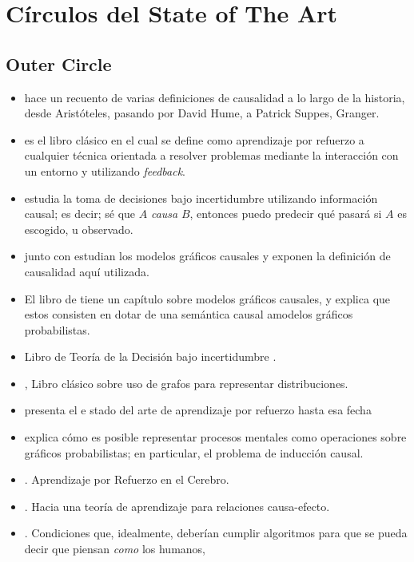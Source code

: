 \documentclass[11pt]{article}
\theoremstyle{plain}
\begin{document}
\section{Círculos del State of The Art}
\subsection{Outer Circle}
\begin{itemize}
\item \cite{holland1986statistics} hace un recuento de varias definiciones de causalidad a lo largo de la historia, desde Aristóteles, pasando por David Hume, a Patrick Suppes, Granger.
\item \cite{sutton1998reinforcement} es el libro clásico en el cual se define como aprendizaje por refuerzo a cualquier técnica orientada a resolver problemas mediante la interacción con un entorno y utilizando \textit{feedback}.
\item \cite{joyce1999foundations} estudia la toma de decisiones bajo incertidumbre utilizando información causal; es decir; sé que $A$ \textit{causa} $B$, entonces puedo predecir qué pasará si $A$ es escogido, u observado.
\item \cite{spirtes2000causation} junto con \cite{pearl2009causality} estudian los modelos gráficos causales y exponen la definición de causalidad aquí utilizada.
\item  El libro de \cite{koller2009probabilistic} tiene un capítulo sobre modelos gráficos causales, y explica que estos consisten en dotar de una semántica causal amodelos gráficos probabilistas.
\item Libro de Teoría de la Decisión bajo incertidumbre \cite{gilboa2009decision}.
\item \cite{pearl1988probabilistic}, Libro clásico sobre uso de grafos para representar distribuciones.
\item \cite{van2012reinforcement} presenta el e stado del arte de aprendizaje por refuerzo hasta esa fecha
\item  \cite{danks2014unifying} explica cómo es posible representar procesos mentales como operaciones sobre gráficos probabilistas; en particular, el problema de inducción causal. 
\item \cite{gershman2015reinforcement}. Aprendizaje por Refuerzo en el Cerebro.
\item \cite{lopez2015towards}. Hacia una teoría de aprendizaje para relaciones causa-efecto.
\item \cite{lake2017building}. Condiciones que, idealmente, deberían cumplir algoritmos para que se pueda decir que piensan \textit{como} los humanos,
\end{itemize}
\end{document}
